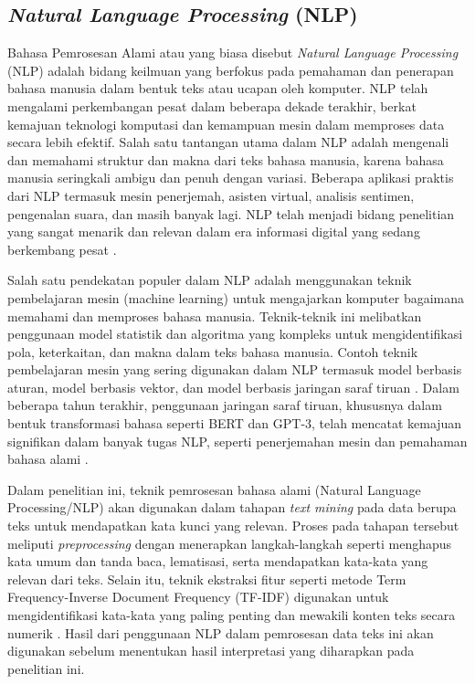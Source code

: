 \subsection{\textit{Natural Language Processing} (NLP)}
Bahasa Pemrosesan Alami atau yang biasa disebut \textit{Natural Language Processing} (NLP) adalah bidang keilmuan yang berfokus pada pemahaman dan penerapan bahasa manusia dalam bentuk teks atau ucapan oleh komputer. NLP telah mengalami perkembangan pesat dalam beberapa dekade terakhir, berkat kemajuan teknologi komputasi dan kemampuan mesin dalam memproses data secara lebih efektif. Salah satu tantangan utama dalam NLP adalah mengenali dan memahami struktur dan makna dari teks bahasa manusia, karena bahasa manusia seringkali ambigu dan penuh dengan variasi. Beberapa aplikasi praktis dari NLP termasuk mesin penerjemah, asisten virtual, analisis sentimen, pengenalan suara, dan masih banyak lagi. NLP telah menjadi bidang penelitian yang sangat menarik dan relevan dalam era informasi digital yang sedang berkembang pesat \cite{tiwari2023}.

Salah satu pendekatan populer dalam NLP adalah menggunakan teknik pembelajaran mesin (machine learning) untuk mengajarkan komputer bagaimana memahami dan memproses bahasa manusia. Teknik-teknik ini melibatkan penggunaan model statistik dan algoritma yang kompleks untuk mengidentifikasi pola, keterkaitan, dan makna dalam teks bahasa manusia. Contoh teknik pembelajaran mesin yang sering digunakan dalam NLP termasuk model berbasis aturan, model berbasis vektor, dan model berbasis jaringan saraf tiruan \cite{CHUNG2023105020}. Dalam beberapa tahun terakhir, penggunaan jaringan saraf tiruan, khususnya dalam bentuk transformasi bahasa seperti BERT dan GPT-3, telah mencatat kemajuan signifikan dalam banyak tugas NLP, seperti penerjemahan mesin dan pemahaman bahasa alami \cite{MOON2022104465}.

Dalam penelitian ini, teknik pemrosesan bahasa alami (Natural Language Processing/NLP) akan digunakan dalam tahapan \textit{text mining} pada data berupa teks untuk mendapatkan kata kunci yang relevan. Proses pada tahapan tersebut meliputi \textit{preprocessing} dengan menerapkan langkah-langkah seperti menghapus kata umum dan tanda baca, lematisasi, serta mendapatkan kata-kata yang relevan dari teks. Selain itu, teknik ekstraksi fitur seperti metode Term Frequency-Inverse Document Frequency (TF-IDF) digunakan untuk mengidentifikasi kata-kata yang paling penting dan mewakili konten teks secara numerik \cite{Nasimuzzaman2023}. Hasil dari penggunaan NLP dalam pemrosesan data teks ini akan digunakan sebelum menentukan hasil interpretasi yang diharapkan pada penelitian ini.

